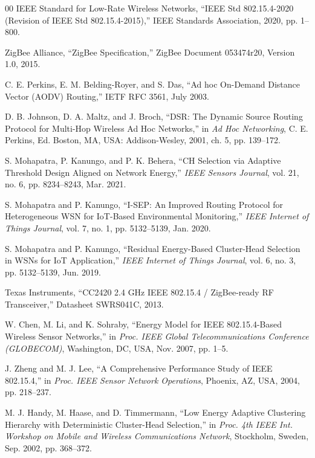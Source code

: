 \documentclass[conference]{IEEEtran}
\begin{document}
\begin{thebibliography}{00}
 IEEE Standard for Low-Rate Wireless Networks, ``IEEE Std 802.15.4-2020 (Revision of IEEE Std 802.15.4-2015),'' IEEE Standards Association, 2020, pp. 1--800.

 ZigBee Alliance, ``ZigBee Specification,'' ZigBee Document 053474r20, Version 1.0, 2015.

 C. E. Perkins, E. M. Belding-Royer, and S. Das, ``Ad hoc On-Demand Distance Vector (AODV) Routing,'' IETF RFC 3561, July 2003.

 D. B. Johnson, D. A. Maltz, and J. Broch, ``DSR: The Dynamic Source Routing Protocol for Multi-Hop Wireless Ad Hoc Networks,'' in \textit{Ad Hoc Networking}, C. E. Perkins, Ed. Boston, MA, USA: Addison-Wesley, 2001, ch. 5, pp. 139--172.

 S. Mohapatra, P. Kanungo, and P. K. Behera, ``CH Selection via Adaptive Threshold Design Aligned on Network Energy,'' \textit{IEEE Sensors Journal}, vol. 21, no. 6, pp. 8234--8243, Mar. 2021.

 S. Mohapatra and P. Kanungo, ``I-SEP: An Improved Routing Protocol for Heterogeneous WSN for IoT-Based Environmental Monitoring,'' \textit{IEEE Internet of Things Journal}, vol. 7, no. 1, pp. 5132--5139, Jan. 2020.

 S. Mohapatra and P. Kanungo, ``Residual Energy-Based Cluster-Head Selection in WSNs for IoT Application,'' \textit{IEEE Internet of Things Journal}, vol. 6, no. 3, pp. 5132--5139, Jun. 2019.

 Texas Instruments, ``CC2420 2.4 GHz IEEE 802.15.4 / ZigBee-ready RF Transceiver,'' Datasheet SWRS041C, 2013.

 W. Chen, M. Li, and K. Sohraby, ``Energy Model for IEEE 802.15.4-Based Wireless Sensor Networks,'' in \textit{Proc. IEEE Global Telecommunications Conference (GLOBECOM)}, Washington, DC, USA, Nov. 2007, pp. 1--5.

 J. Zheng and M. J. Lee, ``A Comprehensive Performance Study of IEEE 802.15.4,'' in \textit{Proc. IEEE Sensor Network Operations}, Phoenix, AZ, USA, 2004, pp. 218--237.

 M. J. Handy, M. Haase, and D. Timmermann, ``Low Energy Adaptive Clustering Hierarchy with Deterministic Cluster-Head Selection,'' in \textit{Proc. 4th IEEE Int. Workshop on Mobile and Wireless Communications Network}, Stockholm, Sweden, Sep. 2002, pp. 368--372.


\end{thebibliography}
\end{document}
